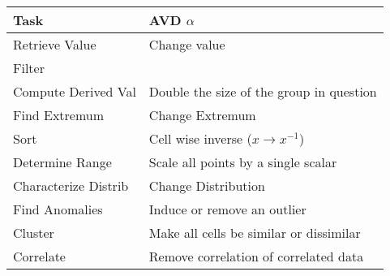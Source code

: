 
\midsepremove

\begin{table}[t]
\centering
{}
\begin{tabular}{|l|p{1.8in}|}
\toprule
Task & AVD $\alpha$\\
\toprule
Retrieve Value & Change value \cellcolor{red!25}\\
Filter &  \\
Compute Derived Val & Double the size of the group in question \\
Find Extremum & Change Extremum \\
Sort & Cell wise inverse ($x \rightarrow x^{-1}$) \\
Determine Range & Scale all points by a single scalar \cellcolor{red!25}\\
Characterize Distrib & Change Distribution \cellcolor{red!25}\\
Find Anomalies & Induce or remove an outlier  \cellcolor{red!25}\\
Cluster & Make all cells be similar or dissimilar  \\
Correlate & Remove correlation of correlated data \\
\bottomrule
\end{tabular}
\label{tab:nusrat-table}
\end{table}

\midsepdefault
      
